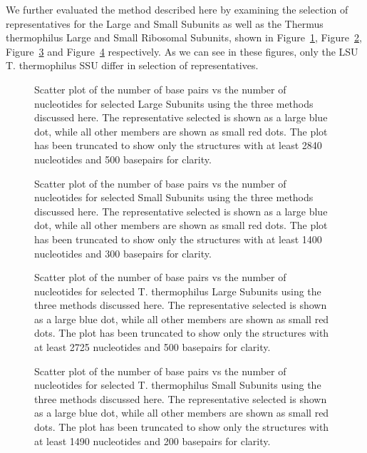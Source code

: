 We further evaluated the method described here by examining the selection of
representatives for the \EC{} Large and Small Subunits as well as the Thermus
thermophilus Large and Small Ribosomal Subunits, shown in
Figure~\ref{fig:ec-lsu-rep}, Figure~\ref{fig:ec-ssu-rep},
Figure~\ref{fig:tt-lsu-rep} and Figure~\ref{fig:tt-ssu-rep} respectively. As we
can see in these figures, only the \EC{} LSU T. thermophilus SSU differ in
selection of representatives.

\begin{figure}
  \caption{Scatter plot of the number of base pairs vs the number of nucleotides
    for selected \EC{} Large Subunits using the three methods discussed here.
    The representative selected is shown as a large blue dot, while all other
    members are shown as small red dots. The plot has been truncated to show
    only the structures with at least 2840 nucleotides and 500 basepairs for
  clarity.}
  \label{fig:ec-lsu-rep}
\end{figure}

\begin{figure}
  \caption{Scatter plot of the number of base pairs vs the number of nucleotides
    for selected \EC{} Small Subunits using the three methods discussed here.
    The representative selected is shown as a large blue dot, while all other
    members are shown as small red dots. The plot has been truncated to show
    only the structures with at least 1400 nucleotides and 300 basepairs for
  clarity.}
  \label{fig:ec-ssu-rep}
\end{figure}

\begin{figure}
  \caption{Scatter plot of the number of base pairs vs the number of nucleotides
    for selected T. thermophilus Large Subunits using the three methods
    discussed here. The representative selected is shown as a large blue dot,
    while all other members are shown as small red dots. The plot has been
    truncated to show only the structures with at least 2725 nucleotides and 500
  basepairs for clarity.}
  \label{fig:tt-lsu-rep}
\end{figure}

\begin{figure}
  \caption{Scatter plot of the number of base pairs vs the number of nucleotides
    for selected T. thermophilus Small Subunits using the three methods
    discussed here. The representative selected is shown as a large blue dot,
    while all other members are shown as small red dots. The plot has been
    truncated to show only the structures with at least 1490 nucleotides and 200
  basepairs for clarity.}
  \label{fig:tt-ssu-rep}
\end{figure}

